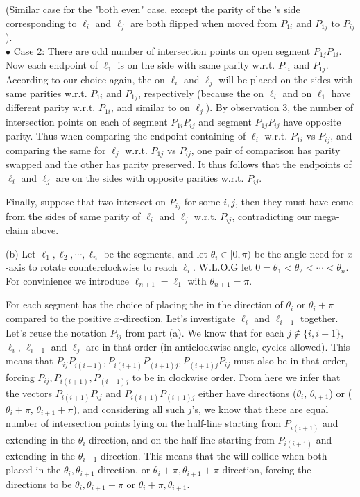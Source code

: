 \documentclass[11pt,a4paper]{article}
\begin{document}
\begin{itemize}
(Similar case for the "both even" case, except the parity of the \animal 's side corresponding to $\ell_i$ and $\ell_j$ are both flipped when moved from $P_{1i}$ and $P_{1j}$ to $P_{ij}$). \\
$\bullet$ Case 2: There are odd number of intersection points on open segment $P_{1j}P_{1i}$.\\ 
Now each endpoint of $\ell_1$ is on the side with same parity w.r.t. $P_{1i}$ and $P_{1j}$. 
According to our choice again, 
the \animals on $\ell_i$ and $\ell_j$ will be placed on the sides with same parities w.r.t. $P_{1i}$ and $P_{1j}$, respectively (because the \animal on $\ell_i$ and \animal on $\ell_1$ have different parity w.r.t. $P_{1i}$, and similar to \animal on $\ell_j$).
By observation 3, the number of intersection points on each of segment $P_{1i}P_{ij}$ and segment $P_{1j}P_{ij}$ have opposite parity. 
Thus when comparing the endpoint containing \animal of $\ell_i$ w.r.t. $P_{1i}$ vs $P_{ij}$, and comparing the same for $\ell_j$ w.r.t. $P_{1j}$ vs $P_{ij}$, one pair of comparison has parity swapped and the other has parity preserved.  
It thus follows that the endpoints of $\ell_i$ and $\ell_j$ are on the sides with opposite parities w.r.t. $P_{ij}$.  

Finally, suppose that two \animals intersect on $P_{ij}$ for some $i, j$, then they must have come from the sides of same parity of $\ell_i$ and $\ell_j$ w.r.t. $P_{ij}$, contradicting our mega-claim above. 

(b) Let $\ell_1, \ell_2, \cdots , \ell_n$ be the segments, and let $\theta_i\in [0, \pi)$ be the angle need for $x$-axis to rotate counterclockwise to reach $\ell_i$. 
W.L.O.G let $0=\theta_1 < \theta_2< \cdots < \theta_n$. For convinience we introduce $\ell_{n+1}=\ell_1$ with $\theta_{n+1}=\pi$. 

For each segment \person has the choice of placing the \animal in the direction of $\theta_i$ or $\theta_i +\pi$ compared to the positive $x$-direction. Let's investigate $\ell_i$ and $\ell_{i+1}$ together. 
Let's reuse the notation $P_{ij}$ from part (a). 
We know that for each $j\not\in\{i, i+1\}$, $\ell_i$, $\ell_{i+1}$ and $\ell_j$ are in that order (in anticlockwise angle, cycles allowed). 
This means that $P_{ij}P_{i(i+1)}, P_{i(i+1)}P_{(i+1)j}, P_{(i+1)j}P_{ij}$ must also be in that order, 
forcing $P_{ij}, P_{i(i+1)}, P_{(i+1)j}$ to be in clockwise order. 
From here we infer that the vectors $P_{i(i+1)}P_{ij}$ and $P_{i(i+1)}P_{(i+1)j}$ either have directions ($\theta_i$, $\theta_{i+1}$) or ($\theta_i +\pi$, $\theta_{i+1} +\pi$), 
and considering all such $j$'s, we know that there are equal number of intersection points lying on the half-line starting from $P_{i(i+1)}$ and extending in the $\theta_i$ direction, and on the half-line starting from $P_{i(i+1)}$ and extending in the $\theta_{i+1}$ direction. 
This means that the \animals will collide when both placed in the $\theta_i, \theta_{i+1}$ direction, or $\theta_i +\pi, \theta_{i+1}+\pi$ direction, 
forcing the directions to be  $\theta_i, \theta_{i+1}+\pi$ or  $\theta_i +\pi, \theta_{i+1}$. 


\end{itemize}
\end{document}
